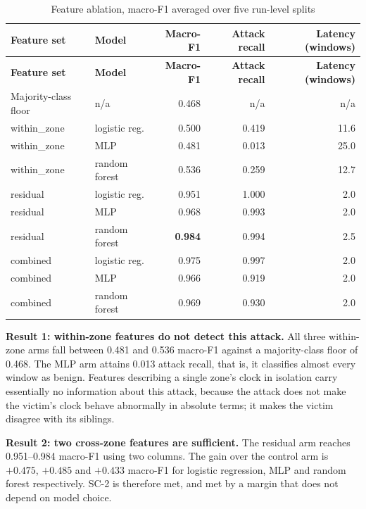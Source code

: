 \begin{longtable}{p{} p{} r r r}
\caption{Feature ablation, macro-F1 averaged over five run-level splits}
\label{tab:ablation}\\
\toprule
\textbf{Feature set} & \textbf{Model} & \textbf{Macro-F1} & \textbf{Attack recall} &
\textbf{Latency (windows)} \\
\midrule
\endfirsthead
\toprule
\textbf{Feature set} & \textbf{Model} & \textbf{Macro-F1} & \textbf{Attack recall} &
\textbf{Latency (windows)} \\
\midrule
\endhead
Majority-class floor & n/a & 0.468 & n/a & n/a \\
\midrule
within\_zone  & logistic reg. & 0.500 & 0.419 & 11.6 \\
within\_zone  & MLP           & 0.481 & 0.013 & 25.0 \\
within\_zone  & random forest & 0.536 & 0.259 & 12.7 \\
\midrule
residual      & logistic reg. & 0.951 & 1.000 & 2.0 \\
residual      & MLP           & 0.968 & 0.993 & 2.0 \\
residual      & random forest & \textbf{0.984} & 0.994 & 2.5 \\
\midrule
combined      & logistic reg. & 0.975 & 0.997 & 2.0 \\
combined      & MLP           & 0.966 & 0.919 & 2.0 \\
combined      & random forest & 0.969 & 0.930 & 2.0 \\
\bottomrule
\end{longtable}

\textbf{Result 1: within-zone features do not detect this attack.} All three
within-zone arms fall between 0.481 and 0.536 macro-F1 against a majority-class floor
of 0.468. The MLP arm attains 0.013 attack recall, that is, it classifies almost every
window as benign. Features describing a single zone's clock in isolation carry
essentially no information about this attack, because the attack does not make the
victim's clock behave abnormally in absolute terms; it makes the victim disagree with
its siblings.

\textbf{Result 2: two cross-zone features are sufficient.} The residual arm reaches
0.951--0.984 macro-F1 using two columns. The gain over the control arm is $+0.475$,
$+0.485$ and $+0.433$ macro-F1 for logistic regression, MLP and random forest
respectively. SC-2 is therefore met, and met by a margin that does not depend on model
choice.

